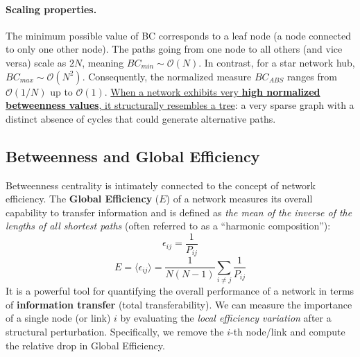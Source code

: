 \paragraph{Scaling properties.} The minimum possible value of BC corresponds to a leaf node (a node connected to only one other node). The paths going from one node to all others (and vice versa) scale as $2N$, meaning $BC_{min} \sim \mathcal{O}(N)$. In contrast, for a star network hub, $BC_{max} \sim \mathcal{O}(N^2)$. Consequently, the normalized measure $BC_{ABS}$ ranges from $\mathcal{O}(1/N)$ up to $\mathcal{O}(1)$.
\uline{When a network exhibits very \textbf{high normalized betweenness values}, it structurally resembles a tree}: a very sparse graph with a distinct absence of cycles that could generate alternative paths.

\subsection{Betweenness and Global Efficiency}

Betweenness centrality is intimately connected to the concept of network efficiency. The \textbf{Global Efficiency} ($E$) of a network measures its overall capability to transfer information and is defined as \textit{the mean of the inverse of the lengths of all shortest paths} (often referred to as a ``harmonic composition''):
\[
    \epsilon_{ij} = \frac{1}{P_{ij}}
\]
\[
    E = \langle \epsilon_{ij} \rangle = \frac{1}{N(N-1)} \sum_{i \neq j} \frac{1}{P_{ij}}
\]
It is a powerful tool for quantifying the overall performance of a network in terms of \textbf{information transfer} (total transferability).
We can measure the importance of a single node (or link) $i$ by evaluating the \textit{local efficiency variation} after a structural perturbation. Specifically, we remove the $i$-th node/link and compute the relative drop in Global Efficiency.

